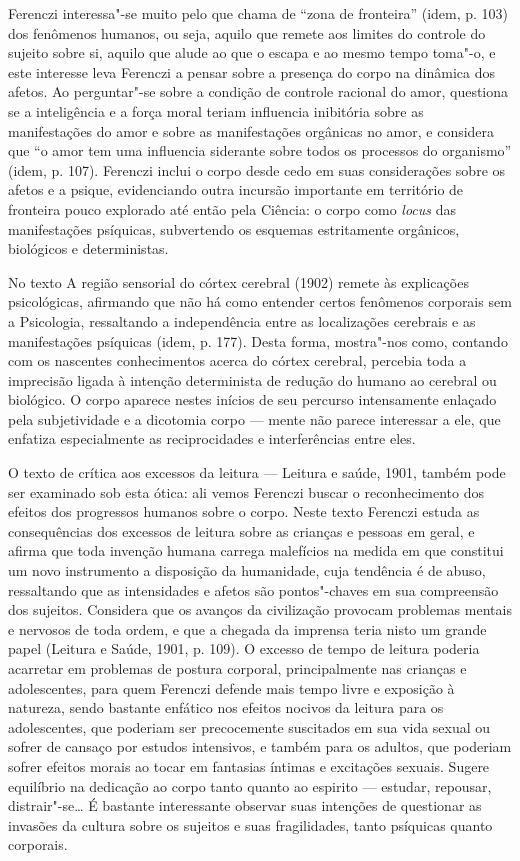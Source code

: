 Ferenczi interessa"-se muito pelo que chama de ``zona de fronteira''
(idem, p. 103) dos fenômenos humanos, ou seja, aquilo que remete aos
limites do controle do sujeito sobre si, aquilo que alude ao que o
escapa e ao mesmo tempo toma"-o, e este interesse leva Ferenczi a pensar
sobre a presença do corpo na dinâmica dos afetos. Ao perguntar"-se sobre
a condição de controle racional do amor, questiona se a inteligência e a
força moral teriam influencia inibitória sobre as manifestações do amor
e sobre as manifestações orgânicas no amor, e considera que ``o amor tem
uma influencia siderante sobre todos os processos do organismo'' (idem,
p. 107). Ferenczi inclui o corpo desde cedo em suas considerações sobre
os afetos e a psique, evidenciando outra incursão importante em
território de fronteira pouco explorado até então pela Ciência: o corpo
como \emph{locus} das manifestações psíquicas, subvertendo os esquemas
estritamente orgânicos, biológicos e deterministas.

No texto A região sensorial do córtex cerebral (1902) remete às
explicações psicológicas, afirmando que não há como entender certos
fenômenos corporais sem a Psicologia, ressaltando a independência entre
as localizações cerebrais e as manifestações psíquicas (idem, p. 177).
Desta forma, mostra"-nos como, contando com os nascentes conhecimentos
acerca do córtex cerebral, percebia toda a imprecisão ligada à intenção
determinista de redução do humano ao cerebral ou biológico. O corpo
aparece nestes inícios de seu percurso intensamente enlaçado pela
subjetividade e a dicotomia corpo --- mente não parece interessar a ele,
que enfatiza especialmente as reciprocidades e interferências entre
eles.

O texto de crítica aos excessos da leitura --- Leitura e saúde, 1901,
também pode ser examinado sob esta ótica: ali vemos Ferenczi buscar o
reconhecimento dos efeitos dos progressos humanos sobre o corpo. Neste
texto Ferenczi estuda as consequências dos excessos de leitura sobre as
crianças e pessoas em geral, e afirma que toda invenção humana carrega
malefícios na medida em que constitui um novo instrumento a disposição
da humanidade, cuja tendência é de abuso, ressaltando que as
intensidades e afetos são pontos"-chaves em sua compreensão dos sujeitos.
Considera que os avanços da civilização provocam problemas mentais e
nervosos de toda ordem, e que a chegada da imprensa teria nisto um
grande papel (Leitura e Saúde, 1901, p. 109). O excesso de tempo de
leitura poderia acarretar em problemas de postura corporal,
principalmente nas crianças e adolescentes, para quem Ferenczi defende
mais tempo livre e exposição à natureza, sendo bastante enfático nos
efeitos nocivos da leitura para os adolescentes, que poderiam ser
precocemente suscitados em sua vida sexual ou sofrer de cansaço por
estudos intensivos, e também para os adultos, que poderiam sofrer
efeitos morais ao tocar em fantasias íntimas e excitações sexuais.
Sugere equilíbrio na dedicação ao corpo tanto quanto ao espirito ---
estudar, repousar, distrair"-se\ldots{} É bastante interessante observar suas
intenções de questionar as invasões da cultura sobre os sujeitos e suas
fragilidades, tanto psíquicas quanto corporais.

